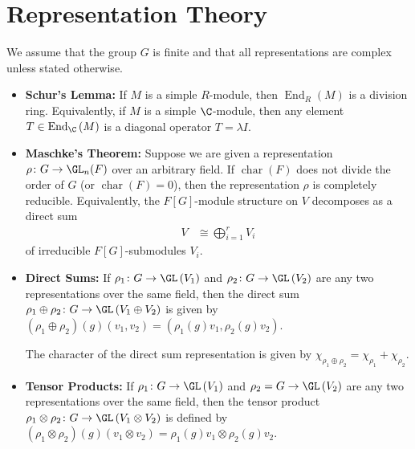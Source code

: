 \documentclass[10pt]{mypackage}
\begin{document}
\section{Representation Theory}%
We assume that the group $G$ is finite and that all representations are complex unless stated otherwise.
\begin{itemize}
  \item \textbf{Schur's Lemma:} If $M$ is a simple $R$-module, then $\operatorname{End}_{R}\left( M \right)$ is a division ring. Equivalently, if $M$ is a simple $\C$-module, then any element $T\in \operatorname{End}_{\C}\left( M \right)$ is a diagonal operator $T = \lambda I$.
  \item \textbf{Maschke's Theorem:} Suppose we are given a representation $\rho\colon G\rightarrow \GL_n(F)$ over an arbitrary field. If $\operatorname{char}(F) $ does not divide the order of $G$ (or $\operatorname{char}(F) = 0$), then the representation $\rho$ is completely reducible. Equivalently, the $F[G]$-module structure on $V$ decomposes as a direct sum
    \begin{align*}
      V &\cong \bigoplus_{i=1}^{r}V_i
    \end{align*}
    of irreducible $F[G]$-submodules $V_i$.
  \item \textbf{Direct Sums:} If $\rho_1\colon  G\rightarrow \GL\left( V_1 \right)$ and $\rho_2\colon G\rightarrow \GL\left( V_2 \right)$ are any two representations over the same field, then the direct sum $\rho_1\oplus \rho_2\colon G\rightarrow \GL\left( V_1\oplus V_2 \right)$ is given by $\left( \rho_1\oplus \rho_2 \right)(g)\left( v_1,v_2 \right) = \left( \rho_1(g)v_1,\rho_2(g)v_2 \right)$.

    The character of the direct sum representation is given by $\chi_{\rho_1\oplus \rho_2} = \chi_{\rho_1} + \chi_{\rho_2}$.
  \item \textbf{Tensor Products:} If $\rho_1\colon G\rightarrow \GL\left(V_1\right)$ and $\rho_2 = G\rightarrow \GL\left( V_2 \right)$ are any two representations over the same field, then the tensor product $\rho_1\otimes \rho_2\colon G\rightarrow \GL\left( V_1\otimes V_2 \right)$ is defined by $\left( \rho_1\otimes \rho_2 \right)(g)\left( v_1\otimes v_2 \right) = \rho_1(g)v_1 \otimes \rho_2(g)v_2$.


\end{itemize}
\end{document}
